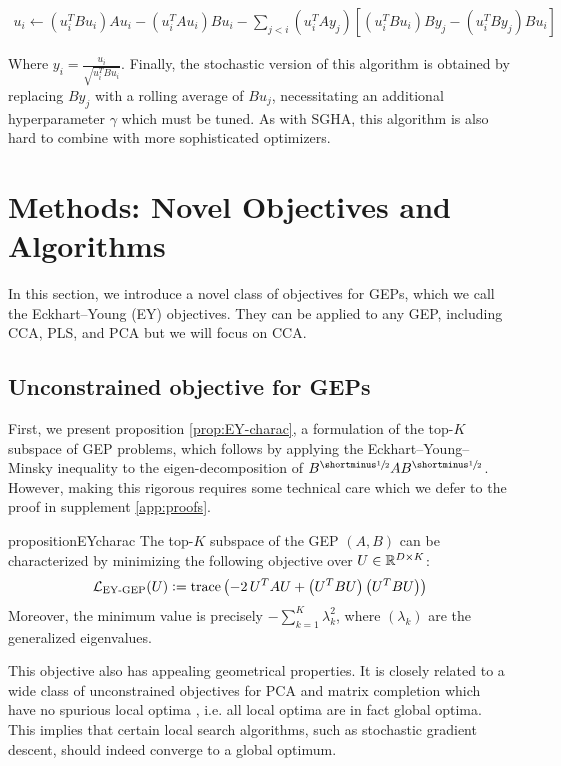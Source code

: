 \begin{align}
    u_i \leftarrow (u_i^T B u_i)A u_i - (u_i^T A u_i)B u_i - \sum_{j < i} (u_i^T A y_j)[(u_i^T B u_i)B y_j - (u_i^T B y_j)B u_i]
\end{align}

Where $y_i = \frac{u_i}{\sqrt{u_i^TBu_i}}$. Finally, the stochastic version of this algorithm is obtained by replacing $B y_j$ with a rolling average of $B u_j$, necessitating an additional hyperparameter $\gamma$ which must be tuned. As with SGHA, this algorithm is also hard to combine with more sophisticated optimizers.

\section{Methods: Novel Objectives and Algorithms}\label{sec:contributions}

In this section, we introduce a novel class of objectives for GEPs, which we call the Eckhart--Young (EY) objectives.
They can be applied to any GEP, including CCA, PLS, and PCA but we will focus on CCA.

\subsection{Unconstrained objective for GEPs}\label{sec:gep-ey-formulation}
First, we present proposition \ref{prop:EY-charac}, a formulation of the top-$K$ subspace of GEP problems, which follows by applying the Eckhart--Young--Minsky inequality \citep{stewart_matrix_1990} to the eigen-decomposition of $B^\mhalf A B^\mhalf$. However, making this rigorous requires some technical care which we defer to the proof in supplement \ref{app:proofs}.

\begin{restatable}{proposition}{EYcharac}
    \label{prop:EY-charac}
    The top-$K$ subspace of the GEP $(A,B)$ can be characterized by minimizing the following objective over $U \in \mathbb{R}^{D \times K}$:
    \begin{align}\label{eq:EY-charac}
    \mathcal{L}_\text{EY-GEP}(U) \vcentcolon= \operatorname{trace} \left( - 2\,U^T A U + \left(U^T B U\right) \left(U^T B U\right) \right)
    \end{align}
    Moreover, the minimum value is precisely $- \sum_{k=1}^K \lambda_k^2$, where $(\lambda_k)$ are the generalized eigenvalues.
\end{restatable}

This objective also has appealing geometrical properties.
It is closely related to a wide class of unconstrained objectives for PCA and matrix completion which have no spurious local optima \citep{ge_no_2017}, i.e. all local optima are in fact global optima.
This implies that certain local search algorithms, such as stochastic gradient descent, should indeed converge to a global optimum.

